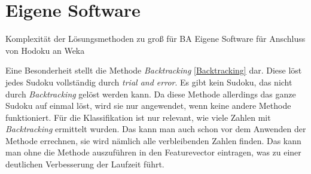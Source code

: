 \section{Eigene Software}
Komplexität der Lösungsmethoden zu groß für BA
Eigene Software für Anschluss von Hodoku an Weka

 Eine Besonderheit stellt die Methode \textit{Backtracking} \ref{Backtracking} dar. Diese löst jedes Sudoku vollständig durch \textit{trial and error}. Es gibt kein Sudoku, das nicht durch \textit{Backtracking} gelöst werden kann. Da diese Methode allerdings das ganze Sudoku auf einmal löst, wird sie nur angewendet, wenn keine andere Methode funktioniert. Für die Klassifikation ist nur relevant, wie viele Zahlen mit \textit{Backtracking} ermittelt wurden. Das kann man auch schon vor dem Anwenden der Methode errechnen, sie wird nämlich alle verbleibenden Zahlen finden. Das kann man ohne die Methode auszuführen in den Featurevector eintragen, was zu einer deutlichen Verbesserung der Laufzeit führt.